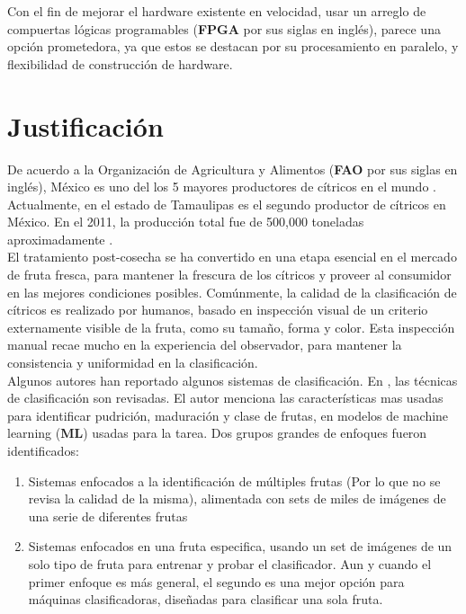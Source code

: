 \documentclass[twoside,spanish,ESP,MSc]{plantillaLabUPV}
\theoremstyle{definition}
\begin{document}
Con el fin de mejorar el hardware existente en velocidad, usar un arreglo de compuertas lógicas programables (\textbf{FPGA} por sus siglas en inglés), parece una opción prometedora, ya que estos se destacan por su procesamiento en paralelo, y flexibilidad de construcción de hardware. 




\section{Justificación}



De acuerdo a la Organización de Agricultura y Alimentos (\textbf{FAO} por sus siglas en inglés), México es uno del los 5 mayores productores de cítricos en el mundo \cite{FAO_2016}. Actualmente, en el estado de Tamaulipas es el segundo productor de cítricos en México. En el 2011, la producción total fue de 500,000 toneladas aproximadamente \cite{sag}.\\ 

El tratamiento post-cosecha se ha convertido en una etapa esencial en el mercado de fruta fresca, para mantener la frescura de los cítricos y proveer al consumidor en las mejores condiciones posibles. Comúnmente, la calidad de la clasificación de cítricos es realizado por humanos, basado en inspección visual de un criterio externamente visible de la fruta, como su tamaño, forma y color. Esta inspección manual recae mucho en la experiencia del observador, para mantener la consistencia y uniformidad en la clasificación.\\ 

Algunos autores han reportado algunos sistemas de clasificación. En \cite{7306754}, las técnicas de clasificación son revisadas. El autor menciona las características mas usadas para identificar pudrición, maduración y clase de frutas, en modelos de machine learning (\textbf{ML}) usadas para la tarea. Dos grupos grandes de enfoques fueron identificados: 


\begin{enumerate}
\itemsep 0em
 \item Sistemas enfocados a la identificación de múltiples frutas (Por lo que no se revisa la calidad de la misma), alimentada con sets de miles de imágenes de una serie de diferentes frutas 
 \item Sistemas enfocados en una fruta especifica, usando un set de imágenes de un solo tipo de fruta para entrenar y probar el clasificador. Aun y cuando el primer enfoque es más general, el segundo es una mejor opción para máquinas clasificadoras, diseñadas para clasificar una sola fruta.
\end{enumerate}
\end{document}
